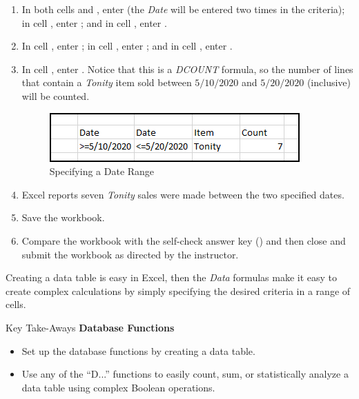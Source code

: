 \begin{enumbox}
	\begin{enumerate}
		\item In both cells  and , enter  (the \textit{Date} will be entered two times in the criteria); in cell , enter ; and in cell , enter .
		\item In cell , enter ; in cell , enter ; and in cell , enter .
		\item In cell , enter  . Notice that this is a \textit{DCOUNT} formula, so the number of lines that contain a \textit{Tonity} item sold between $ 5/10/2020 $ and $ 5/20/2020 $ (inclusive) will be counted.
		
		\begin{figure}[H]
			\centering
			\includegraphics[width=\maxwidth{.95\linewidth}]{gfx/ch09_fig24}
			\caption{Specifying a Date Range}
			\label{09:fig24}
		\end{figure}
	
		\item Excel reports seven \textit{Tonity} sales were made between the two specified dates.
		\item Save the  workbook.
		\item Compare the workbook with the self-check answer key () and then close and submit the  workbook as directed by the instructor.	
	\end{enumerate}
\end{enumbox}

Creating a data table is easy in Excel, then the \textit{Data} formulas make it easy to create complex calculations by simply specifying the desired criteria in a range of cells.
	
\begin{center}
	\begin{tkwbox}{Key Take-Aways}
		\textbf{Database Functions}
		\\
		\begin{itemize}
			\setlength{\itemsep}{0pt}
			\setlength{\parskip}{0pt}
			\setlength{\parsep}{0pt}
			
			\item Set up the database functions by creating a data table.
			\item Use any of the ``D...'' functions to easily count, sum, or statistically analyze a data table using complex Boolean operations. 
			
		\end{itemize}
	\end{tkwbox}
\end{center}

